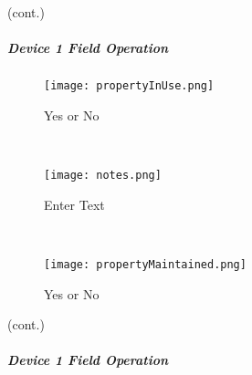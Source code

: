 {\footnotesize (cont.)}
\vspace{1in}

\vspace{2in}

\vspace{2.7in}

\clearpage


\subparagraph*{Device 1 Field Operation}
\begin{wrapfigure}{r}{0.4\textwidth}
\centering
    \texttt{[image: propertyInUse.png]}
\caption {Yes or No}
\vspace{.05in}

\HRule \\[.4cm] %
\vspace{.1in}

    \texttt{[image: notes.png]}
\caption {Enter Text}
\vspace{.05in}

\HRule \\[.4cm] %
\vspace{.1in}

    \texttt{[image: propertyMaintained.png]}
\caption{Yes or No}
\end{wrapfigure}

{\footnotesize (cont.)}
\vspace{.75in}

\vspace{2.75in}

\vspace{2.25in}


\clearpage

\subparagraph*{Device 1 Field Operation}

